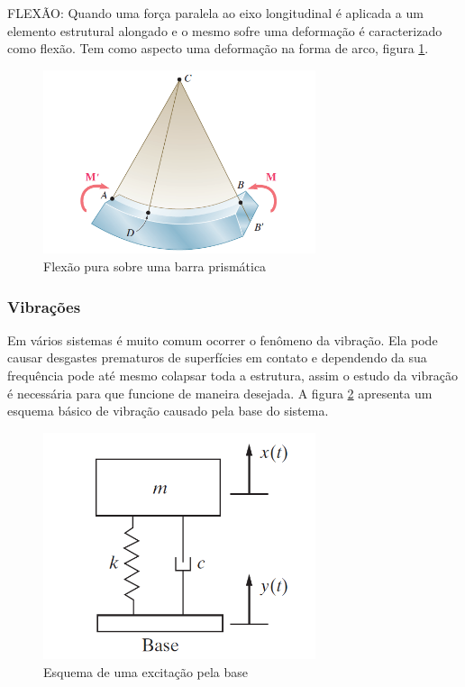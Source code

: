 FLEXÃO: Quando uma força paralela ao eixo longitudinal é aplicada a um elemento estrutural alongado e o mesmo sofre uma deformação é caracterizado como flexão. Tem como aspecto uma deformação na forma de arco, figura \ref{fig:flexao_pura}.
\begin{figure}[H]
	\centering
	\includegraphics[width=8cm]{figuras/flexao_pura.png}
	\caption{Flexão pura sobre uma barra prismática}
	\label{fig:flexao_pura}
\end{figure}

\subsubsection{Vibrações}

Em vários sistemas é muito comum ocorrer o fenômeno da vibração. Ela pode causar desgastes prematuros de superfícies em contato e dependendo da sua frequência pode até mesmo colapsar toda a estrutura, assim o estudo da vibração é necessária para que funcione de maneira desejada. A figura \ref{fig:esquema_excitacao} apresenta um esquema básico de vibração causado pela base do sistema.
\begin{figure}[H]
	\centering
	\includegraphics[width=8cm]{figuras/esquema_excitacao.png}
	\caption{Esquema de uma excitação pela base}
	\label{fig:esquema_excitacao}
\end{figure}

